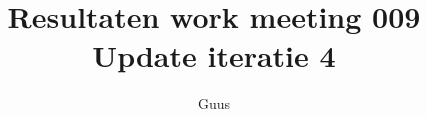 \documentclass[a4paper,final]{article}
\title{Resultaten work meeting 009 Update iteratie 4 }
\author{Guus}
\begin{document}

\newcommand{\Noc}{\textsc{NoC}\xspace}%
\newcommand{\w}[1]{\textsc{#1}\xspace}%
\newcommand{\qml}{\textsc{Qml}\xspace}%
\newcommand{\qt}{\textsc{Qt}\xspace}%
\newcommand{\qtquick}{\textsc{QtQuick}\xspace}%
\newcommand{\cpp}{\textsc{C++}\xspace}%
\newcommand{\code}[1]{\texttt{#1}\xspace}%
\newcommand{\xmas}{\textsc{xmas}\xspace}%
\newcommand{\xmv}{\textsc{Xmv}\xspace}%
\newcommand{\xmd}{\textsc{Xmd}\xspace}%
\newcommand{\xmvtest}{\textsc{XmvTest}\xspace}%
\newcommand{\xmdtest}{\textsc{XmdTest}\xspace}%
\newcommand{\bitpowder}{\textsc{Bitpowder}\xspace}%
\newcommand{\datamodel}{\textsc{datamodel}\xspace}%
\newcommand{\vt}{\textsc{Vt}\xspace}%
\newcommand{\src}{\textsc{src}\xspace}%
\newcommand{\agilefant}{\textsc{AgileFant}\xspace}%
\newcommand{\een}{\'{e}\'{e}n\xspace}%
\newcommand{\svn}{\textsc{svn}\xspace}%
\newcommand{\git}{\textsc{git}\xspace}%
\newcommand{\github}{\textsc{Github}\xspace}%
\newcommand{\subversion}{\textsc{subversion}\xspace}%
\newcommand{\radboud}{\textsc{Radboud}\xspace}%
\newcommand{\uml}{\textsc{uml}\xspace}%
\end{document}
